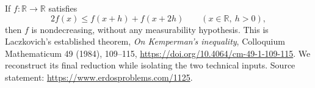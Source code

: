 If \(f:\mathbb R\to\mathbb R\) satisfies
\[
 2f(x)\leq f(x+h)+f(x+2h)\qquad(x\in\mathbb R,\ h>0),
\]
then \(f\) is nondecreasing, without any measurability hypothesis.
This is Laczkovich's established theorem, \emph{On Kemperman's inequality}, Colloquium Mathematicum 49 (1984), 109--115, \url{https://doi.org/10.4064/cm-49-1-109-115}.
We reconstruct its final reduction while isolating the two technical inputs. Source statement: \url{https://www.erdosproblems.com/1125}.
